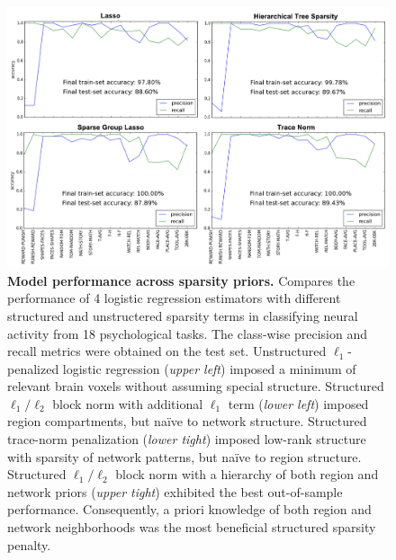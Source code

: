 \documentclass{article} %
\begin{document}
\begin{figure}
\begin{centering}
\includegraphics[width=1.00\textwidth]{figures/sparsities.pdf}
\end{centering}
\vspace{-0.6cm}
\caption{\textbf{Model performance across sparsity priors.}
Compares the performance of 4 logistic regression estimators
with different structured and unstructered sparsity terms
in classifying neural activity from 18 psychological tasks.
The class-wise precision and recall metrics
were obtained on the test set.
%
Unstructured $\ell_1$-penalized logistic regression (\textit{upper left})
imposed a minimum of relevant brain voxels without
assuming special structure.
Structured $\ell_1/\ell_2$ block norm with additional $\ell_1$ term
(\textit{lower left})
imposed region compartments, but na\"ive to network structure.
Structured trace-norm penalization (\textit{lower tight})
imposed low-rank structure
with sparsity of network patterns, but na\"ive to region structure.
Structured $\ell_1/\ell_2$ block norm with a hierarchy of
both region and network priors (\textit{upper tight})
exhibited the best out-of-sample performance.
%
Consequently, a priori knowledge of both region and network neighborhoods
was the most beneficial structured sparsity penalty.
}
\label{fig_sparsities}
\end{figure}
\end{document}
